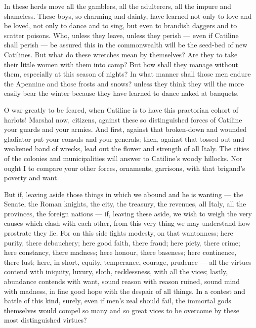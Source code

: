  In these herds move all the gamblers, all the adulterers, all the impure and shameless. These boys, so charming and dainty, have learned not only to love and be loved, not only to dance and to sing, but even to brandish daggers and to scatter poisons. Who, unless they leave, unless they perish --- even if Catiline shall perish --- be assured this in the commonwealth will be the seed-bed of new Catilines. But what do these wretches mean by themselves? Are they to take their little women with them into camp? But how shall they manage without them, especially at this season of nights? In what manner shall those men endure the Apennine and those frosts and snows? unless they think they will the more easily bear the winter because they have learned to dance naked at banquets.

 O war greatly to be feared, when Catiline is to have this praetorian cohort of harlots! Marshal now, citizens, against these so distinguished forces of Catiline your guards and your armies. And first, against that broken-down and wounded gladiator put your consuls and your generals; then, against that tossed-out and weakened band of wrecks, lead out the flower and strength of all Italy. The cities of the colonies and municipalities will answer to Catiline's woody hillocks. Nor ought I to compare your other forces, ornaments, garrisons, with that brigand's poverty and want.

 But if, leaving aside those things in which we abound and he is wanting --- the Senate, the Roman knights, the city, the treasury, the revenues, all Italy, all the provinces, the foreign nations --- if, leaving these aside, we wish to weigh the very causes which clash with each other, from this very thing we may understand how prostrate they lie. For on this side fights modesty, on that wantonness; here purity, there debauchery; here good faith, there fraud; here piety, there crime; here constancy, there madness; here honour, there baseness; here continence, there lust; here, in short, equity, temperance, courage, prudence --- all the virtues contend with iniquity, luxury, sloth, recklessness, with all the vices; lastly, abundance contends with want, sound reason with reason ruined, sound mind with madness, in fine good hope with the despair of all things. In a contest and battle of this kind, surely, even if men's zeal should fail, the immortal gods themselves would compel so many and so great vices to be overcome by these most distinguished virtues?

